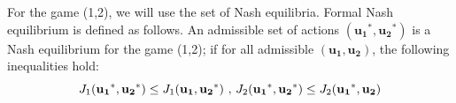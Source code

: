 \documentclass[conference]{IEEEtran}
\begin{document}
For the game (1,2), we will use the set of Nash equilibria. Formal Nash equilibrium is defined as follows.
An admissible set of actions $(\boldsymbol{u_1}^*,  \boldsymbol{u_2}^*)$ is a Nash equilibrium for the game (1,2); if for all admissible $(\boldsymbol{u_1},  \boldsymbol{u_2})$, the following inequalities hold:
\begin{equation}\label{nash_lqe}
	J_1(\boldsymbol{\mathrm{u_1}}^*, \boldsymbol{\mathrm{u_2}}^*)\leq J_1(\boldsymbol{\mathrm{u_1}}, \boldsymbol{\mathrm{u_2}}^*) \text{\rm{ , }}
	J_2(\boldsymbol{\mathrm{u_1}}^*, \boldsymbol{\mathrm{u_2}}^*)\leq 
	J_2(\boldsymbol{\mathrm{u_1}}^*, \boldsymbol{\mathrm{u_2}})
\end{equation}
\end{document}
